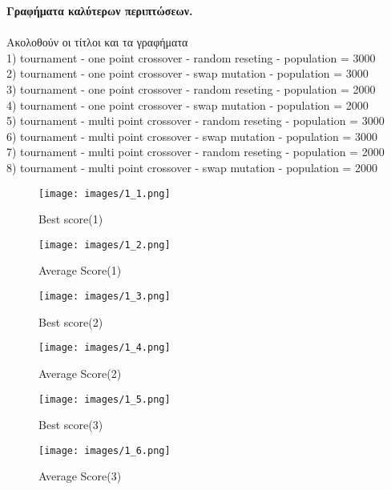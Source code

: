 \documentclass[12pt]{article}
\begin{document}
{\bfseries Γραφήματα καλύτερων περιπτώσεων.}\\\\
Ακολοθούν οι τίτλοι και τα γραφήματα\\
1) tournament - one point crossover - random reseting - population = 3000\\
2) tournament - one point crossover - swap mutation - population = 3000\\
3) tournament - one point crossover - random reseting - population = 2000\\
4) tournament - one point crossover - swap mutation - population = 2000\\
5) tournament - multi point crossover - random reseting - population = 3000\\
6) tournament - multi point crossover - swap mutation - population = 3000\\
7) tournament - multi point crossover - random reseting - population = 2000\\
8) tournament - multi point crossover - swap mutation - population = 2000\\
\begin{figure}[!h]
\centering
\begin{minipage}{.5\textwidth}
  \centering
  \texttt{[image: images/1\_1.png]}
  \caption{Best score(1)}
  \label{fig:my_label}
\end{minipage}%
\begin{minipage}{.5\textwidth}
  \centering
  \texttt{[image: images/1\_2.png]}
  \caption{Average Score(1)}
  \label{fig:my_label}
\end{minipage}
\end{figure}
\begin{figure}[!h]
\centering
\begin{minipage}{.5\textwidth}
  \centering
  \texttt{[image: images/1\_3.png]}
  \caption{Best score(2)}
  \label{fig:my_label}
\end{minipage}%
\begin{minipage}{.5\textwidth}
  \centering
  \texttt{[image: images/1\_4.png]}
  \caption{Average Score(2)}
  \label{fig:my_label}
\end{minipage}
\end{figure}
\begin{figure}[!h]
\centering
\begin{minipage}{.5\textwidth}
  \centering
  \texttt{[image: images/1\_5.png]}
  \caption{Best score(3)}
  \label{fig:my_label}
\end{minipage}%
\begin{minipage}{.5\textwidth}
  \centering
  \texttt{[image: images/1\_6.png]}
  \caption{Average Score(3)}
  \label{fig:my_label}
\end{minipage}
\end{figure}
\end{document}
